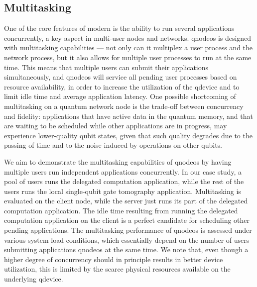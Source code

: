 
\subsection{Multitasking}

One of the core features of modern  is the ability to run several applications
concurrently, a key aspect in multi-user nodes and networks. \acrshort{qnodeos} is designed with
multitasking capabilities --- not only can it multiplex a user process and the network process, but
it also allows for multiple user processes to run at the same time. This means that multiple users
can submit their applications simultaneously, and \acrshort{qnodeos} will service all pending user
processes based on resource availability, in order to increase the utilization of the
\acrshort{qdevice} and to limit idle time and average application latency. One possible shortcoming
of multitasking on a quantum network node is the trade-off between concurrency and fidelity:
applications that have active data in the quantum memory, and that are waiting to be scheduled while
other applications are in progress, may experience lower-quality qubit states, given that such
quality degrades due to the passing of time and to the noise induced by operations on other qubits.

We aim to demonstrate the multitasking capabilities of \acrshort{qnodeos} by having multiple users
run independent applications concurrently. In our case study, a pool of users runs the delegated
computation application, while the rest of the users runs the local single-qubit gate tomography
application. Multitasking is evaluated on the client node, while the server just runs its part of
the delegated computation application. The idle time resulting from running the delegated
computation application on the client is a perfect candidate for scheduling other pending
applications. The multitasking performance of \acrshort{qnodeos} is assessed under various system
load conditions, which essentially depend on the number of users submitting applications
\acrshort{qnodeos} at the same time. We note that, even though a higher degree of concurrency should
in principle results in better device utilization, this is limited by the scarce physical resources
available on the underlying \acrshort{qdevice}.

